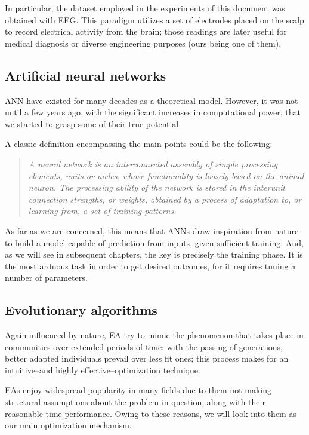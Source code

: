 		In particular, the dataset employed in the experiments of this document was obtained with \acs{EEG}. This paradigm utilizes a set of electrodes placed on the scalp to record electrical activity from the brain; those readings are later useful for medical diagnosis or diverse engineering purposes (ours being one of them).

	\subsection{Artificial neural networks}

		\ac{ANN} have existed for many decades as a theoretical model. However, it was not until a few years ago, with the significant increases in computational power, that we started to grasp some of their true potential.

		A classic definition encompassing the main points could be the following: 

		\begin{quotation}
			\textit{A neural network is an interconnected assembly of simple processing elements, units or nodes, whose functionality is loosely based on the animal neuron. The processing ability of the network is stored in the interunit connection strengths, or weights, obtained by a process of adaptation to, or learning from, a set of training patterns. \cite{nnintro}}
		\end{quotation}

		As far as we are concerned, this means that \acs{ANN}s draw inspiration from nature to build a model capable of prediction from inputs, given sufficient training. And, as we will see in subsequent chapters, the key is precisely the training phase. It is the most arduous task in order to get desired outcomes, for it requires tuning a number of parameters.

	\subsection{Evolutionary algorithms}

		Again influenced by nature, \ac{EA} try to mimic the phenomenon that takes place in communities over extended periods of time: with the passing of generations, better adapted individuals prevail over less fit ones; this process makes for an intuitive--and highly effective--optimization technique.

		\acs{EA}s enjoy widespread popularity in many fields due to them not making structural assumptions about the problem in question, along with their reasonable time performance. Owing to these reasons, we will look into them as our main optimization mechanism.

